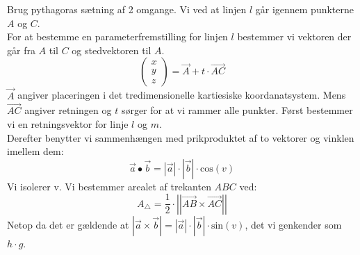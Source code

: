 \begin{tcolorbox}[title=Opgave 6,
    colback=blue!1!white,
    colframe=black,
    colbacktitle=blue!25!white,
    coltitle=red!25!black,
    fonttitle=\bfseries,
    subtitle style={boxrule=0.4pt,
    colback=blue!7!white} ]
        Brug pythagoras sætning af 2 omgange.
        Vi ved at linjen \(l\) går igennem punkterne \(A\) og \(C\).\\
        For at bestemme en parameterfremstilling for linjen \(l\) bestemmer vi vektoren der går fra \(A\) til \(C\) og stedvektoren til \(A\).\\
        \[\begin{pmatrix} x\\y\\z \end{pmatrix}=\overrightarrow{A}+t\cdot \overrightarrow{AC}\]
        \(\overrightarrow{A}\) angiver placeringen i det tredimensionelle kartiesiske koordanatsystem. Mens \(\overrightarrow{AC}\) angiver retningen og \(t\) sørger for at vi rammer alle punkter.
        Først bestemmer vi en retningsvektor for linje \(l\) og \(m\).\\
        Derefter benytter vi sammenhængen med prikproduktet af to vektorer og vinklen imellem dem:
        \[\overrightarrow{a}\bullet \overrightarrow{b}=\left|\overrightarrow{a}\right|\cdot\left|\overrightarrow{b}\right|\cdot \text{cos}(v)\]
        Vi isolerer v.
        Vi bestemmer arealet af trekanten \(ABC\) ved:
        \[A_\triangle=\frac{1}{2} \cdot \left|\left| \overrightarrow{AB} \times \overrightarrow{AC}\right|\right|\]
        Netop da det er gældende at \(\displaystyle \left|\overrightarrow{a} \times \overrightarrow{b} \right|=\left|\overrightarrow{a}\right|\cdot \left|\overrightarrow{b} \right|\cdot \text{sin}(v)\), det vi genkender som \(h\cdot g\). 
\end{tcolorbox}
